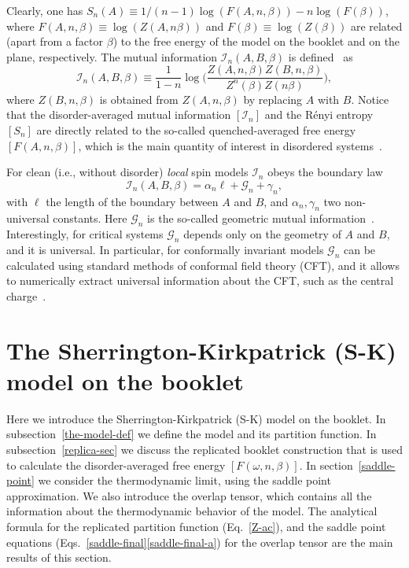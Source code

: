 \documentclass[twocolumn,superscriptaddress,prb,10pt]{revtex4-1}
\begin{document}
Clearly, one has $S_n(A)\equiv1/(n-1)\log(F(A,n,\beta))-n\log(F(\beta))$, where $F(A,n,\beta)
\equiv\log(Z(A,n\beta))$ and $F(\beta)\equiv\log(Z(\beta))$ are related (apart from a factor 
$\beta$) to the free energy of the model on the booklet and on the plane, respectively.
The mutual information ${\mathcal I}_n(A,B,\beta)$ is defined~\cite{jaconis-2013,stephan-2014} 
as 
%
\begin{equation}
\label{MI}
{\mathcal I}_n(A,B,\beta)\equiv\frac{1}{1-n}\log\Big(
\frac{Z(A,n,\beta)Z(B,n,\beta)}{Z^n(\beta)Z(n\beta)}
\Big),
\end{equation}
%
where $Z(B,n,\beta)$ is obtained from $Z(A,n,\beta)$ by replacing $A$ with $B$. 
Notice that the disorder-averaged mutual information $[{\mathcal I}_n]$ and the R\'enyi 
entropy $[S_n]$ are directly related to the so-called quenched-averaged free energy 
$[F(A,n,\beta)]$, which is the main quantity of interest in disordered systems~\cite{cardy-book}. 

For clean (i.e., without disorder) \emph{local} spin models ${\mathcal I}_n$ 
obeys the boundary law 
%
\begin{equation}
{\mathcal I}_n(A,B,\beta)=\alpha_n\ell+{\mathcal G}_n+\gamma_n,
\label{GMI}
\end{equation}
%
with $\ell$ the length of the boundary between $A$ and $B$, and 
$\alpha_n,\gamma_n$ two non-universal constants. Here ${\mathcal G}_n$ 
is the so-called geometric mutual information~\cite{stephan-2014}. 
Interestingly, for critical systems ${\mathcal G}_n$ depends only on the 
geometry of $A$ and $B$, and it is universal. In particular, for conformally 
invariant models ${\mathcal G}_n$ can be calculated using standard methods of 
conformal field theory (CFT), and it allows to numerically 
extract universal information about the CFT, such as the central 
charge~\cite{stephan-2014}.  


\section{The Sherrington-Kirkpatrick (S-K) model on the booklet}
\label{the-model}

Here we introduce the Sherrington-Kirkpatrick (S-K) model on the booklet. 
In subsection~\ref{the-model-def}  we define the 
model and its partition function. In subsection~\ref{replica-sec} 
we discuss the replicated booklet construction that is used to calculate the 
disorder-averaged free energy $[F(\omega,n,\beta)]$. 
In section~\ref{saddle-point} we consider the thermodynamic limit, 
using the saddle point approximation. We also introduce the overlap tensor,  
which contains all the information about the thermodynamic behavior of the 
model. The analytical formula for the replicated partition function (Eq.~\eqref{Z-ac}), 
and the saddle point equations (Eqs.~\eqref{saddle-final}\eqref{saddle-final-a}) 
for the overlap tensor are the main results of this section. 
\end{document}
